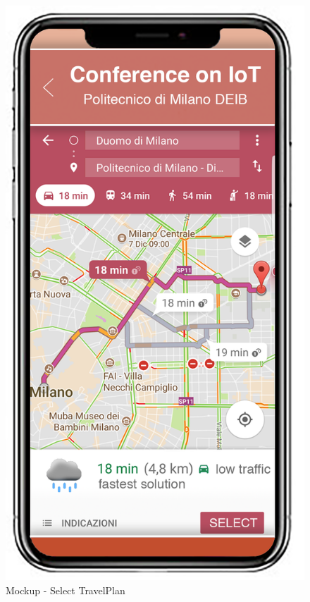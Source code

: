 \begin{figure}[H]
\begin{minipage}{0.5\textwidth}
		\centerline{\includegraphics[width=0.3\paperwidth]{Images/SelectTravelPlan}}
		\caption{Mockup - Select TravelPlan}
	\end{minipage}
\end{figure}	
